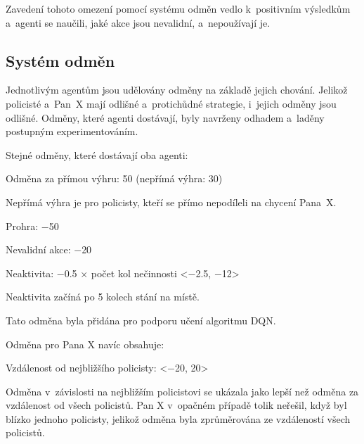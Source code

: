 Zavedení tohoto omezení pomocí systému odměn vedlo k~positivním výsledkům a~agenti se naučili, jaké akce jsou nevalidní, a~nepoužívají je.

\subsection{Systém odměn}
\label{subsec:odmeny}

Jednotlivým agentům jsou udělovány odměny na základě jejich chování.
Jelikož policisté a~Pan~X mají odlišné a~protichůdné strategie, i~jejich odměny jsou odlišné.
Odměny, které agenti dostávají, byly navrženy odhadem a~laděny postupným experimentováním.

\bigskip

Stejné odměny, které dostávají oba agenti:
\begin{myitemize}
  \item Odměna za přímou výhru: 50 (nepřímá výhra: 30)
  \begin{myitemize}
    \item Nepřímá výhra je pro policisty, kteří se přímo nepodíleli na chycení Pana~X\@.
  \end{myitemize}
  \item Prohra: $\minus$50
  \item Nevalidní akce: $\minus$20
  \item Neaktivita: $\minus$0.5 $\times$ počet kol nečinnosti <$\minus$2.5, $\minus$12>
  \begin{myitemize}
    \item Neaktivita začíná po 5 kolech stání na místě.
    \item Tato odměna byla přidána pro podporu učení algoritmu DQN\@.
  \end{myitemize}
\end{myitemize}

\bigskip

Odměna pro Pana X navíc obsahuje:
\begin{myitemize}
  \item Vzdálenost od nejbližšího policisty: <$\minus$20, 20>
  \begin{myitemize}
    \item Odměna v~závislosti na nejbližším policistovi se ukázala jako lepší než odměna za vzdálenost od všech policistů.
    Pan X v~opačném případě tolik neřešil, když byl blízko jednoho policisty, jelikož odměna byla zprůměrována ze vzdáleností všech policistů.
  \end{myitemize}
\end{myitemize}

